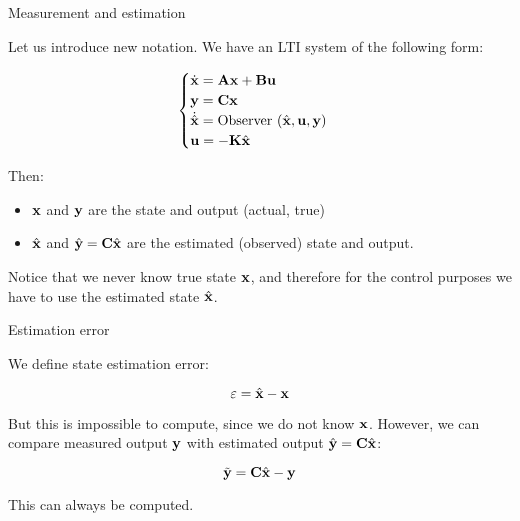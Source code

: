 \documentclass{beamer}
\begin{document}
\begin{frame}{Measurement and estimation}
\begin{flushleft}

Let us introduce new notation. We have an LTI system of the following form:

\begin{equation}
\begin{cases}
\dot {\mathbf{x}} = \mathbf{A} \mathbf{x} + \mathbf{B} \mathbf{u} \\
\mathbf{y} = \mathbf{C} \mathbf{x} \\
\dot{\hat{\mathbf{x}}} = \text{Observer} \ (\hat{\mathbf{x}}, \mathbf{u}, \mathbf{y}) \\
\mathbf{u} = -\mathbf{K}\hat{\mathbf{x}}
\end{cases}
\end{equation}

Then:

\begin{itemize}
\item $\mathbf{x}$ and $\mathbf{y}$ are the state and output (actual, true)
\item $\hat{\mathbf{x}}$ and $\hat{\mathbf{y}} =\mathbf{C} \hat{\mathbf{x}}$ are the estimated (observed) state
and output.
\end{itemize}

Notice that we never know true state $\mathbf{x}$, and therefore for the control purposes we have to use the estimated state $\hat{\mathbf{x}}$.

\end{flushleft}
\end{frame}




\begin{frame}{Estimation error}
	\begin{flushleft}
		
		We define state estimation error:
		
		\begin{equation}
			\varepsilon = \hat{\mathbf{x}} - \mathbf{x}
		\end{equation}
		
		But this is impossible to compute, since we do not know $\mathbf{x}$. However, we can compare measured output $\mathbf{y}$ with estimated output $\hat{\mathbf{y}} =\mathbf{C} \hat{\mathbf{x}}$:
		
		\begin{equation}
			\Tilde{\mathbf{y}} = \mathbf{C} \hat{\mathbf{x}} - \mathbf{y} 
		\end{equation}		
		
		This can always be computed.
		
	\end{flushleft}
\end{frame}
\end{document}
